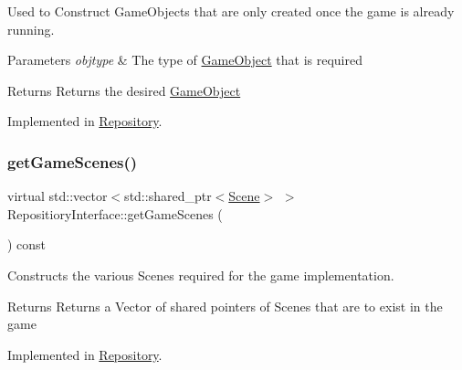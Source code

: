 Used to Construct Game\+Objects that are only created once the game is already running. 


\begin{DoxyParams}{Parameters}
{\em objtype} & The type of \hyperlink{class_game_object}{Game\+Object} that is required \\
\hline
\end{DoxyParams}
\begin{DoxyReturn}{Returns}
Returns the desired \hyperlink{class_game_object}{Game\+Object} 
\end{DoxyReturn}


Implemented in \hyperlink{class_repository_ab239e9b04db0524e168d54201bcd7076}{Repository}.

\mbox{\label{class_repositiory_interface_a29a0f0fadd317082cb504bbb1161d50d}} 
\subsubsection{\texorpdfstring{get\+Game\+Scenes()}{getGameScenes()}}
{\footnotesize\ttfamily virtual std\+::vector$<$std\+::shared\+\_\+ptr$<$\hyperlink{class_scene}{Scene}$>$ $>$ Repositiory\+Interface\+::get\+Game\+Scenes (\begin{DoxyParamCaption}{ }\end{DoxyParamCaption}) const\hspace{0.3cm}{\ttfamily [pure virtual]}}



Constructs the various Scenes required for the game implementation. 

\begin{DoxyReturn}{Returns}
Returns a Vector of shared pointers of Scenes that are to exist in the game 
\end{DoxyReturn}


Implemented in \hyperlink{class_repository_ad49505f4ec3a15d0812ede7ff82b8be2}{Repository}.

\mbox{\label{class_repositiory_interface_a428e935faa2fd5790cbccc09f1066ef6}} 
